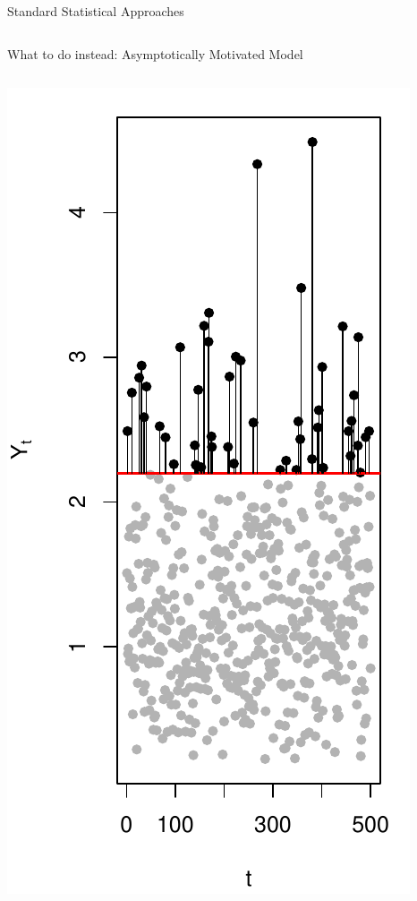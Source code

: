 \begin{frame}{Standard Statistical Approaches}
\begin{columns}
\begin{column}{0.5\textwidth}
\end{column}
\end{columns}
  
\end{frame} 

\begin{frame}{What to do instead: Asymptotically Motivated Model}
\begin{columns}
\begin{column}{0.3\textwidth}
\includegraphics[width = \textwidth]{threshold_exceedances.pdf}

\end{column}
\end{columns}
\end{frame}
